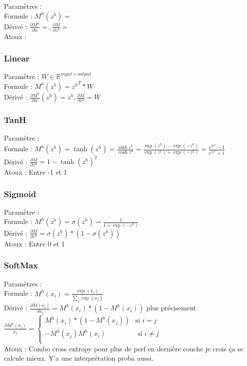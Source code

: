 \documentclass{article}
\theoremstyle{plain}%
\theoremstyle{definition}
\theoremstyle{remark}
\begin{document}
\begin{multicols}{2}
Paramètres : \\
Formule : $ M^h(z^h) =  $ \\
Dérivé : $ \frac{\partial M^h}{\partial w} = , \frac{\partial M}{\partial z^h} = $ \\
Atoux : 


\subsubsection{Linear}
Paramètre : $ W \in \mathbb{R}^{input \times output} $ \\
Formule : $ M^h(z^h) =  {z^h}^T * W $ \\
Dérivé : $ \frac{\partial M^h}{\partial w}(z^h) = z^h, \frac{\partial M}{\partial z^h} = W $ \\

\subsubsection{TanH}
Paramètre : \\
Formule : $ M^h(z^h) =  \tanh(z^h) = \frac{\sinh z^h}{\cosh z^h} = \frac{\exp(z^h) - \exp(-z^h)} {\exp(z^h) + \exp(-z^h)} = \frac{e^{2z^h} - 1 }{e^{2z^h} + 1}$ \\
Dérivé : $\frac{\partial M}{\partial z^h} = 1 - \tanh (z^h)^2$ \\
Atoux : Entre -1 et 1


\subsubsection{Sigmoid}
Paramètre : \\
Formule : $ M^h(z^h) =  \sigma(z^h) = \frac{1}{1 + \exp(-z^h)}$ \\
Dérivé : $ \frac{\partial M}{\partial z^h} = \sigma (z^h) * (1 - \sigma (z^h)) $ \\
Atoux : Entre 0 et 1


\subsubsection{SoftMax}
Paramètres : \\
Formule : $ M^h(x_i) = \frac{\exp(x_i)}{\sum_j \exp(x_j)} $ \\
Dérivé : $ \frac{\partial M(x_i)}{\partial x_i} = M^h(x_i) * (1 - M^h(x_i)) $ plus précisement $ \frac{\partial M^h(x_i)}{x_j} = \begin{cases}
    M^h(x_i) * ( 1 - M^h(x_j) ) &\text{si } i = j \\
    - M^h(x_j) M^h(x_i) &\text{ si } i \neq j \\
\end{cases}  $  \\
Atoux : Combo cross entropy pour plus de perf en dernière couche je crois ça se calcule mieux. Y'a une interprétation proba aussi.



\end{multicols}
\end{document}
